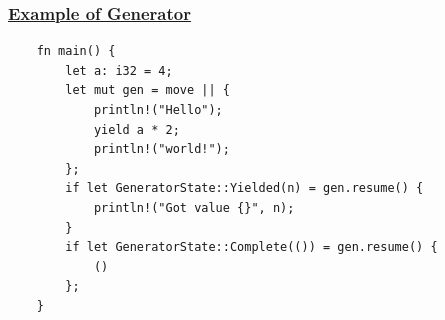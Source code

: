 \begin{frame}[fragile]
    \frametitle{\href{https://cfsamson.github.io/books-futures-explained/3_generators_async_await.html}{Example of Generator}}
% 
% 
\begin{block}{}
    \begin{verbatim}
    fn main() {
        let a: i32 = 4;
        let mut gen = move || {
            println!("Hello");
            yield a * 2;
            println!("world!");
        };
        if let GeneratorState::Yielded(n) = gen.resume() {
            println!("Got value {}", n);
        }
        if let GeneratorState::Complete(()) = gen.resume() {
            ()
        };
    } \end{verbatim}
\end{block}
% 
\end{frame}

